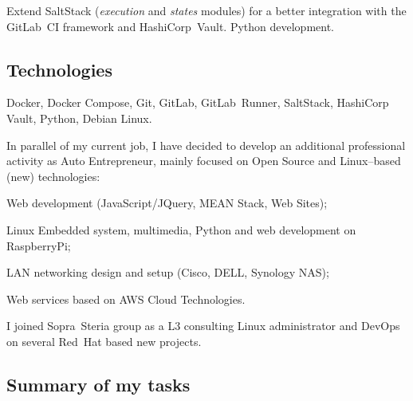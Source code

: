 \vskip 0pt\noindent
Extend SaltStack ({\it execution} and {\it states} modules) for a better integration with
the GitLab~CI framework and HashiCorp~Vault. Python development.

\subsection{Technologies}

\vskip 0pt\noindent
Docker, Docker Compose, Git, GitLab, GitLab~Runner, SaltStack, HashiCorp Vault,
Python, Debian Linux.



In parallel of my current job, I have decided to develop an additional professional
activity as Auto Entrepreneur, mainly focused on Open Source and Linux--based (new) technologies:

\item{\bdot} Web development (JavaScript/JQuery, MEAN Stack, Web Sites);
\item{\bdot} Linux Embedded system, multimedia, Python and web development on RaspberryPi;
\item{\bdot} LAN networking design and setup (Cisco, DELL, Synology NAS);
\item{\bdot} Web services based on AWS Cloud Technologies.



I joined Sopra~Steria group as a L3 consulting Linux administrator and DevOps on
several Red~Hat based new projects.

\subsection{Summary of my tasks}

